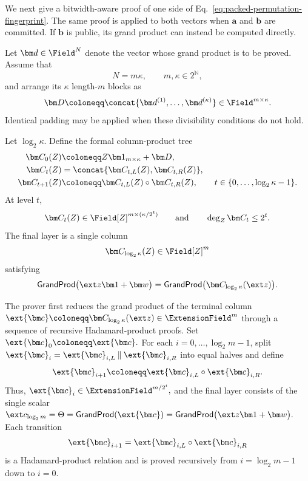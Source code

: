 We next give a bitwidth-aware proof of one side of
Eq.~\eqref{eq:packed-permutation-fingerprint}. The same proof is
applied to both vectors when \(\bm a\) and \(\bm b\) are
committed. If \(\bm b\) is public, its grand product can instead
be computed directly.

Let \(\bm d\in\Field^N\) denote the vector whose grand product is
to be proved. Assume that
\[
    N=m\kappa,
    \qquad
    m,\kappa\in2^{\mathbb N},
\]
and arrange its \(\kappa\) length-\(m\) blocks as
\[
    \bm D
    \coloneqq
    \concat{
        \bm d^{(1)},\ldots,\bm d^{(\kappa)}
    }
    \in\Field^{m\times\kappa}.
\]
Identical padding may be applied when these divisibility
conditions do not hold.

Let \(\log_2\kappa\). Define the formal column-product
tree
\begin{equation}
\begin{aligned}
    \bm C_0(Z)
    &\coloneqq
    Z\bm 1_{m\times\kappa}+\bm D,\\
    \bm C_t(Z)
    &=
    \concat{
        \bm C_{t,L}(Z),
        \bm C_{t,R}(Z)
    },\\
    \bm C_{t+1}(Z)
    &\coloneqq
    \bm C_{t,L}(Z)
    \circ
    \bm C_{t,R}(Z),
    \qquad
    t\in\{0,\ldots,\log_2\kappa-1\}.
\end{aligned}
\label{eq:packed-permutation-product-tree}
\end{equation}
At level \(t\),
\[
    \bm C_t(Z)
    \in
    \Field[Z]^{m\times(\kappa/2^t)}
    \qquad\text{and}\qquad
    \deg_Z\bm C_t\leq2^t.
\]
The final layer is a single column
\[
    \bm C_{\log_2 \kappa}(Z)
    \in\Field[Z]^m
\]
satisfying
\begin{equation*}
    \mathsf{GrandProd}
    \bigl(\ext z\bm 1+\bm w\bigr)
    =
    \mathsf{GrandProd}
    \bigl(\bm C_{\log_2 \kappa}(\ext z)\bigr).
\end{equation*}

The prover first reduces the grand product of the terminal column
\(
    \ext{\bm c}
    \coloneqq
    \bm C_{\log_2\kappa}(\ext z)
    \in\ExtensionField^m
\)
through a sequence of recursive Hadamard-product proofs. Set
\(
    \ext{\bm c}_0
    \coloneqq
    \ext{\bm c}.
\)
For each \(i=0,\ldots,\log_2m-1\), split
\(
    \ext{\bm c}_i
    =
    \ext{\bm c}_{i,L}
    \mathbin{\|}
    \ext{\bm c}_{i,R}
\)
into equal halves and define
\begin{equation*}
    \ext{\bm c}_{i+1}
    \coloneqq
    \ext{\bm c}_{i,L}
    \circ
    \ext{\bm c}_{i,R}.
\end{equation*}
Thus,
\(
    \ext{\bm c}_i
    \in
    \ExtensionField^{m/2^i},
\)
and the final layer consists of the single scalar
\(
    \ext c_{\log_2m}
    =
    \Theta
    =
    \mathsf{GrandProd}(\ext{\bm c})
    =
    \mathsf{GrandProd}
    \bigl(\ext z\bm 1+\bm w\bigr).
\)
Each transition
\[
    \ext{\bm c}_{i+1}
    =
    \ext{\bm c}_{i,L}
    \circ
    \ext{\bm c}_{i,R}
\]
is a Hadamard-product relation and is proved recursively from
\(i=\log_2m-1\) down to \(i=0\).


